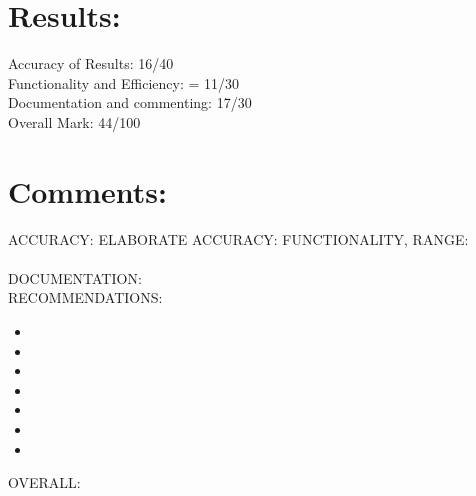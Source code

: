 \documentclass[11pt]{article} %
\begin{document}

\section{Results:}

Accuracy of Results: 16/40 \\
Functionality and Efficiency: = 11/30 \\ 
Documentation and commenting: 17/30 \\ 
Overall Mark: 44/100 \\

\section{Comments:}

ACCURACY:
ELABORATE ACCURACY:
FUNCTIONALITY, RANGE:
\\
\\ 
DOCUMENTATION:
\\
RECOMMENDATIONS:
\begin{itemize}
\item {}
\item {}
\item {}
\item {}
\item {}
\item {}
\item {}
\end{itemize}
OVERALL: 
\end{document}
